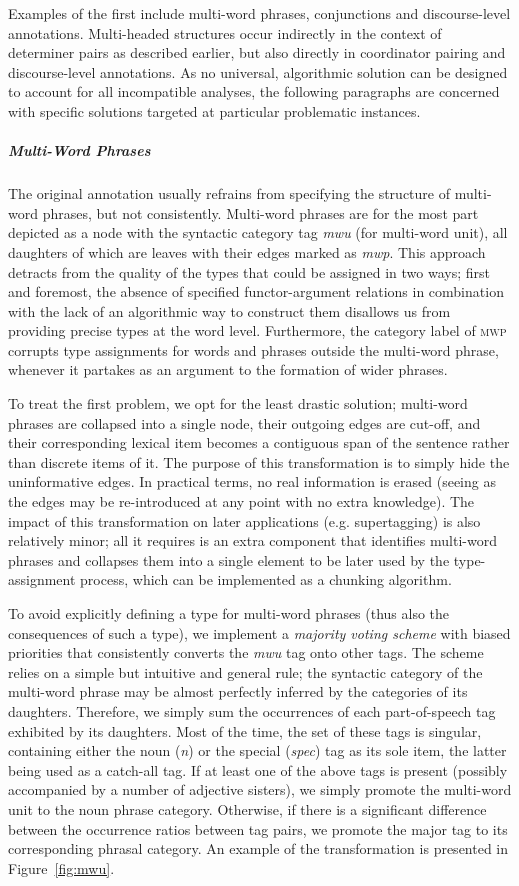 Examples of the first include multi-word phrases, conjunctions and discourse-level annotations.
Multi-headed structures occur indirectly in the context of determiner pairs as described earlier, but also directly in coordinator pairing and discourse-level annotations.
As no universal, algorithmic solution can be designed to account for all incompatible analyses, the following paragraphs are concerned with specific solutions targeted at particular problematic instances.

\subparagraph{Multi-Word Phrases}
The original annotation usually refrains from specifying the structure of multi-word phrases, but not consistently.
Multi-word phrases are for the most part depicted as a node with the syntactic category tag \textit{mwu} (for multi-word unit), all daughters of which are leaves with their edges marked as \textit{mwp}.
This approach detracts from the quality of the types that could be assigned in two ways; first and foremost, the absence of specified functor-argument relations in combination with the lack of an algorithmic way to construct them disallows us from providing precise types at the word level.
Furthermore, the category label of \textsc{mwp} corrupts type assignments for words and phrases outside the multi-word phrase, whenever it partakes as an argument to the formation of wider phrases.

To treat the first problem, we opt for the least drastic solution; multi-word phrases are collapsed into a single node, their outgoing edges are cut-off, and their corresponding lexical item becomes a contiguous span of the sentence rather than discrete items of it. 
The purpose of this transformation is to simply hide the uninformative edges.
In practical terms, no real information is erased (seeing as the edges may be re-introduced at any point with no extra knowledge).
The impact of this transformation on later applications (e.g. supertagging) is also relatively minor; all it requires is an extra component that identifies multi-word phrases and collapses them into a single element to be later used by the type-assignment process, which can be implemented as a chunking algorithm.

To avoid explicitly defining a type for multi-word phrases (thus also the consequences of such a type), we implement a \textit{majority voting scheme} with biased priorities that consistently converts the \textit{mwu} tag onto other tags.
The scheme relies on a simple but intuitive and general rule; the syntactic category of the multi-word phrase may be almost perfectly inferred by the categories of its daughters. 
Therefore, we simply sum the occurrences of each part-of-speech tag exhibited by its daughters. 
Most of the time, the set of these tags is singular, containing either the noun (\textit{n}) or the special (\textit{spec}) tag as its sole item, the latter being used as a catch-all tag.
If at least one of the above tags is present (possibly accompanied by a number of adjective sisters), we simply promote the multi-word unit to the noun phrase category.
Otherwise, if there is a significant difference between the occurrence ratios between tag pairs, we promote the major tag to its corresponding phrasal category. 
An example of the transformation is presented in Figure~\ref{fig:mwu}.

